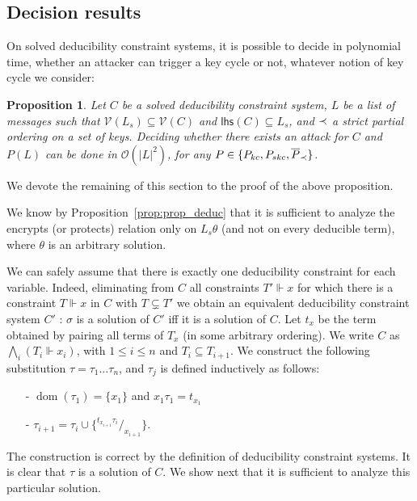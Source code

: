 \documentclass[acmtocl,acmnow]{acmtrans2m}
\newtheorem{proposition}[theorem]{Proposition}
\newcommand{\var}{\mathcal{V}}
\newcommand{\dom}{\operatorname{dom}}
\newcommand{\set}[1]{\lbrace{#1}\rbrace}
\newcommand{\subst}[2]{{}^{#2}\!/_{\!#1}}
\newcommand{\lleft}[1]{\mathsf{lhs}(#1)}
\newcommand{\lset}[1]{#1_s}
\newcommand{\dedcons}[1]{deducibility constraint}
\newcommand{\dedsys}[1]{deducibility constraint system}
\newcommand{\dedsyss}[1]{deducibility constraint systems}
\begin{document}
\subsection{Decision results}

On solved \dedsyss{}, it is possible to decide in polynomial time,
whether an attacker can trigger a key cycle or not, whatever notion of
key cycle we consider: 

\begin{proposition}\label{lemma_deter_ext}
Let  $C$ be a solved \dedsys{}, $L$ be a list of messages such that
$\var(\lset{L})\subseteq\var(C)$ and $\lleft{C}\subseteq \lset{L}$, and $\prec$ a strict partial ordering on a
set of keys. Deciding whether there exists an attack for $C$ and $P(L)$  can be done in $\mathcal{O}(|L|^2)$, for any $P\in \{P_{kc}, P_{skc},\overline{P}_{\prec}\}$.
\end{proposition}





We devote the remaining of this section to the proof of the above proposition.

We know by Proposition~\ref{prop:prop_deduc} that it is sufficient to analyze the encrypts (or protects)
relation only on $\lset{L}\theta$ (and not on every deducible term), where $\theta$ is an arbitrary
 solution.

We can safely assume that there is exactly one \dedcons{} for each variable. 
Indeed, eliminating from $C$ all constraints $T'\Vdash x$ 
for which there is a constraint $T\Vdash x$ in $C$ with $T\subsetneq T'$ 
we obtain an equivalent \dedsys{} $C'$ : $\sigma$ is a solution of $C'$ iff it is a solution of $C$.
Let $t_x$ be the term obtained by pairing all terms of $T_x$ (in some arbitrary ordering).
We write $C$ as $\bigwedge_i(T_i\Vdash x_i)$, with $1\le i\le n$ and $T_i\subseteq T_{i+1}$.
We construct the following substitution $\tau=\tau_1\dots\tau_n$,
and $\tau_j$ is defined inductively as follows:
\begin{itemize}
\item[-] $\dom(\tau_1)=\set{x_1}$ and $x_1\tau_1=t_{x_1}$
\item[-] $\tau_{i+1}=\tau_i\cup\set{\subst{x_{i+1}}{t_{x_{i+1}}\tau_i}}$.
\end{itemize}
The construction is correct by the definition of \dedsyss{}.
It is clear that $\tau$ is a  solution of $C$. We show next that it is sufficient to analyze this
particular solution. 
\end{document}
